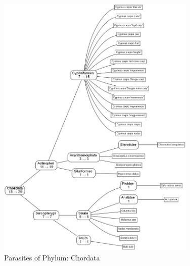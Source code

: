       \begin{figure}[h!]
        \centering
        \includegraphics[trim = 0mm 0mm 0mm 0mm, clip, width=0.85\textwidth]{Figures/ChordataParasites.png}
        \caption{Parasites of Phylum: Chordata}
        \label{fig:ChordataParasites}
      \end{figure}

